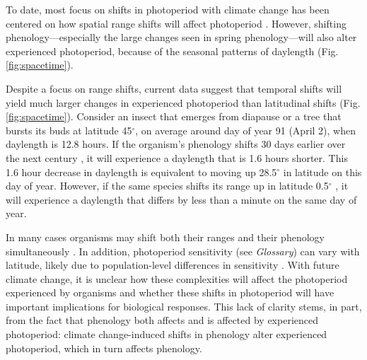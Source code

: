 \documentclass{article}
\begin{document}
\par To date, most focus on shifts in photoperiod with climate change has been centered on how spatial range shifts will affect photoperiod \citep[e.g.,][]{saikkonen2012,way2015}. However, shifting phenology---especially the large changes seen in spring phenology---will also alter experienced photoperiod, because of the seasonal patterns of daylength (Fig. \ref{fig:spacetime}). 
\par Despite a focus on range shifts, current data suggest that temporal shifts will yield much larger changes in experienced photoperiod than latitudinal shifts (Fig. \ref{fig:spacetime}). %
Consider an insect that emerges from diapause or a tree that bursts its buds at latitude 45$^{\circ}$, on average around day of year 91 (April 2), when daylength is 12.8 hours. If the organism's phenology shifts 30 days earlier over the next century \citep[i.e., a rate of ~3 days per decade, as has been observed,][]{parmesan2003}, it will experience a daylength that is 1.6 hours shorter. This 1.6 hour decrease in daylength is equivalent to moving up 28.5$^{\circ}$ in latitude on this day of year. However, if the same species shifts its range up in latitude 0.5$^{\circ}$ \citep[i.e., 60 km over the next century, comparable to observed rates,][]{chen2011,parmesan2003}, it will experience a daylength that differs by less than a minute on the same day of year. 

\par In many cases organisms may shift both their ranges and their phenology simultaneously \citep[i.e., due to new climatic conditions,][]{duputie2015,grevstad2015}. In addition, photoperiod sensitivity (see \emph{Glossary}) can vary with latitude, likely due to population-level differences in sensitivity \citep{gauzere2017,saikkonen2012,Caffarra:2011b,bradshaw2007,Vihera-Aarnio:2006aa,Partanen:2005aa,Howe:1996}.
With future climate change, it is unclear how these complexities will affect the photoperiod experienced by organisms and whether these shifts in photoperiod will have important implications for biological responses. This lack of clarity stems, in part, from the fact that phenology both affects and is affected by experienced photoperiod: climate change-induced shifts in phenology alter experienced photoperiod, which in turn affects phenology. 
\end{document}
